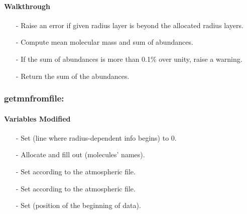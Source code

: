 \documentclass[letterpaper,12pt]{article}
\begin{document}
\paragraph{Walkthrough}
\begin{enumerate}[leftmargin=10pt, noitemsep, parsep=0pt, topsep=0ex]
\item[-] Raise an error if given radius layer is beyond the allocated radius layers.
\item[-] Compute mean molecular mass and sum of abundances.
\item[-] If the sum of abundances is more than 0.1\% over unity, raise a warning.
\item[-] Return the sum of the abundances.
\end{enumerate}

\subsubsection{getmnfromfile:}
\paragraph{Variables Modified}
\begin{enumerate}[leftmargin=10pt, noitemsep, parsep=0pt, topsep=0ex]
\item[-] Set  (line where radius-dependent info begins) to 0.
\item[-] Allocate and fill out  (molecules' names).
\item[-] Set  according to the atmospheric file.
\item[-] Set  according to the atmospheric file.
\item[-] Set  (position of the beginning of data).
\end{enumerate}
\end{document}
